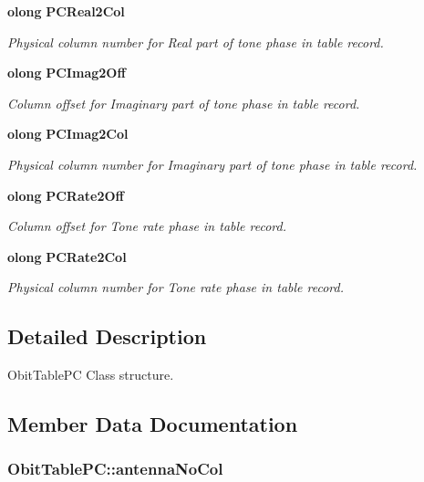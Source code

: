 \begin{CompactItemize}
{\bf olong} {\bf PCReal2Col}
\begin{CompactList}\small\item\em Physical column number for Real part of tone phase in table record. \item\end{CompactList}\item 
{\bf olong} {\bf PCImag2Off}
\begin{CompactList}\small\item\em Column offset for Imaginary part of tone phase in table record. \item\end{CompactList}\item 
{\bf olong} {\bf PCImag2Col}
\begin{CompactList}\small\item\em Physical column number for Imaginary part of tone phase in table record. \item\end{CompactList}\item 
{\bf olong} {\bf PCRate2Off}
\begin{CompactList}\small\item\em Column offset for Tone rate phase in table record. \item\end{CompactList}\item 
{\bf olong} {\bf PCRate2Col}
\begin{CompactList}\small\item\em Physical column number for Tone rate phase in table record. \item\end{CompactList}\end{CompactItemize}


\subsection{Detailed Description}
Obit\-Table\-PC Class structure. 



\subsection{Member Data Documentation}
\subsubsection{ {\bf Obit\-Table\-PC::antenna\-No\-Col}}\label{structObitTablePC_o24}


